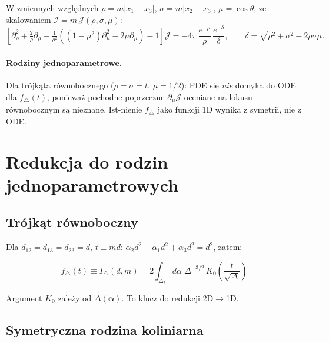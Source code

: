 \documentclass[11pt,a4paper]{article}
\newcommand{\Dt}{\Delta}
\begin{document}
W zmiennych wzgl\k{e}dnych $\rho=m|x_1-x_3|$, $\sigma=m|x_2-x_3|$, $\mu=\cos\theta$,
ze skalowaniem $\mathcal I = m\,\mathcal J(\rho,\sigma,\mu)$:
\begin{equation}
\label{eq:pde_dim_less}
\left[
\partial_\rho^2 + \tfrac{2}{\rho}\partial_\rho
+ \tfrac{1}{\rho^2}\!\left((1-\mu^2)\partial_\mu^2 - 2\mu\partial_\mu\right)
- 1
\right]\mathcal J
= -4\pi\,\frac{e^{-\rho}}{\rho}\,\frac{e^{-\delta}}{\delta},
\qquad \delta=\sqrt{\rho^2+\sigma^2-2\rho\sigma\mu}.
\end{equation}

\paragraph{Rodziny jednoparametrowe.}
Dla tr\'ojk\k{a}ta r\'ownobocznego ($\rho=\sigma=t$, $\mu=1/2$): PDE si\k{e} \textit{nie} domyka
do ODE dla $f_\triangle(t)$, poniewa\.{z} pochodne poprzeczne $\partial_\mu\mathcal J$
oceniane na lokusu r\'ownobocznym s\k{a} nieznane. Ist-nienie $f_\triangle$
jako funkcji 1D wynika z symetrii, nie z ODE.

\section{Redukcja do rodzin jednoparametrowych}
\label{sec:families}

\subsection{Tr\'ojk\k{a}t r\'ownoboczny}

Dla $d_{12}=d_{13}=d_{23}=d$, $t\equiv md$:
$\alpha_2 d^2+\alpha_1 d^2+\alpha_3 d^2 = d^2$, zatem:

\begin{equation}
\label{eq:f_triangle_feynman}
\boxed{
f_\triangle(t)
\equiv I_\triangle(d,m)
= 2\int_{\Delta_2} d\alpha\;
\Dt^{-3/2}\,K_0\!\left(\frac{t}{\sqrt\Dt}\right)
}
\end{equation}

Argument $K_0$ zale\.{z}y od $\Dt(\bm\alpha)$. To klucz do redukcji 2D$\to$1D.

\subsection{Symetryczna rodzina koliniarna}
\end{document}
